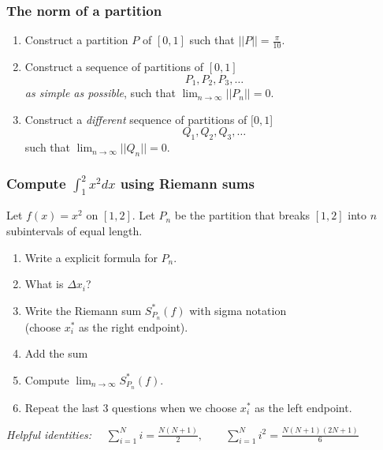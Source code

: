 \documentclass[14pt]{beamer}
\newcommand{\setsize}[1]{\fontsize{#1}{#1}\selectfont} %
\newcommand{\smallerfont}{\setsize{13}} %
\begin{document}
	\begin{frame}[t]
		\smallerfont
		\frametitle{The norm of a partition}

		\begin{enumerate}
			\item Construct a partition $P$ of $[0,1]$ such that ${\displaystyle ||P|| = \frac{\pi}{10}}$.

			\item Construct a sequence of partitions of $[0,1]$
				\[
					P_{1}, P_{2}, P_{3}, \ldots
				\]
				\emph{as simple as possible}, such that ${\displaystyle \lim_{n \to \infty} ||P_n|| = 0}$.

			\item Construct a \emph{different} sequence of partitions of $[0,1$]
				\[
					Q_{1}, Q_{2}, Q_{3}, \ldots
				\]
				such that ${\displaystyle \lim_{n \to \infty} ||Q_n|| = 0}$.
		\end{enumerate}
	\end{frame}
	\begin{frame}[t]
		\smallerfont
		\frametitle{Compute ${\displaystyle \int_1^2 \! x^2 dx}$ using Riemann sums}

		\begin{block}{}
			Let ${\displaystyle f(x) = x^2}$ on $[1,2]$. Let $P_{n}$ be the partition
			that breaks $[1,2]$ into $n$ subintervals of equal length.
			\begin{enumerate}
				\item Write a explicit formula for $P_{n}$.

				\item What is $\Delta x_{i}$?

				\item Write the Riemann sum ${\displaystyle S^*_{P_n} (f)}$ with sigma notation
					\\ (choose $x^{*}_{i}$ as the right endpoint).

				\item Add the sum

				\item Compute ${\displaystyle \lim_{n \to \infty} S^*_{P_n} (f)}$.

				\item Repeat the last 3 questions when we choose $x^{*}_{i}$ as the left
					endpoint.
			\end{enumerate}
		\end{block}

		{\setsize{10} \emph{Helpful identities:} ${\displaystyle \quad \sum_{i=1}^N i = \frac{N(N+1)}{2}, \quad \quad \sum_{i=1}^{N} i^2 = \frac{N(N+1)(2N+1)}{6}}$ }
	\end{frame}
\end{document}
